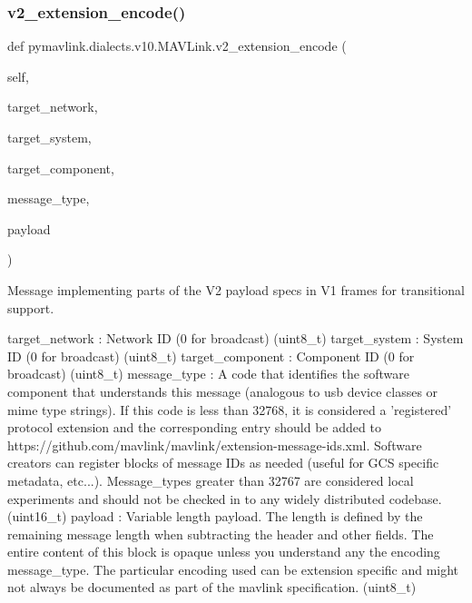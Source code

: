 \begin{DoxyVerb}
\begin{DoxyVerb}
\begin{DoxyVerb}
\begin{DoxyVerb}
\begin{DoxyVerb}
\begin{DoxyVerb}
\begin{DoxyVerb}
\begin{DoxyVerb}
\begin{DoxyVerb}
\begin{DoxyVerb}
\subsubsection{\texorpdfstring{v2\+\_\+extension\+\_\+encode()}{v2\_extension\_encode()}}
{\footnotesize\ttfamily def pymavlink.\+dialects.\+v10.\+M\+A\+V\+Link.\+v2\+\_\+extension\+\_\+encode (\begin{DoxyParamCaption}\item[{}]{self,  }\item[{}]{target\+\_\+network,  }\item[{}]{target\+\_\+system,  }\item[{}]{target\+\_\+component,  }\item[{}]{message\+\_\+type,  }\item[{}]{payload }\end{DoxyParamCaption})}

\begin{DoxyVerb}Message implementing parts of the V2 payload specs in V1 frames for
transitional support.

target_network            : Network ID (0 for broadcast) (uint8_t)
target_system             : System ID (0 for broadcast) (uint8_t)
target_component          : Component ID (0 for broadcast) (uint8_t)
message_type              : A code that identifies the software component that understands this message (analogous to usb device classes or mime type strings).  If this code is less than 32768, it is considered a 'registered' protocol extension and the corresponding entry should be added to https://github.com/mavlink/mavlink/extension-message-ids.xml.  Software creators can register blocks of message IDs as needed (useful for GCS specific metadata, etc...). Message_types greater than 32767 are considered local experiments and should not be checked in to any widely distributed codebase. (uint16_t)
payload                   : Variable length payload. The length is defined by the remaining message length when subtracting the header and other fields.  The entire content of this block is opaque unless you understand any the encoding message_type.  The particular encoding used can be extension specific and might not always be documented as part of the mavlink specification. (uint8_t)\end{DoxyVerb}
 \mbox{\label{classpymavlink_1_1dialects_1_1v10_1_1MAVLink_aeab910bd83c888b86429d02eb853d54c}} 

\end{DoxyVerb}
\end{DoxyVerb}
\end{DoxyVerb}
\end{DoxyVerb}
\end{DoxyVerb}
\end{DoxyVerb}
\end{DoxyVerb}
\end{DoxyVerb}
\end{DoxyVerb}
\end{DoxyVerb}
